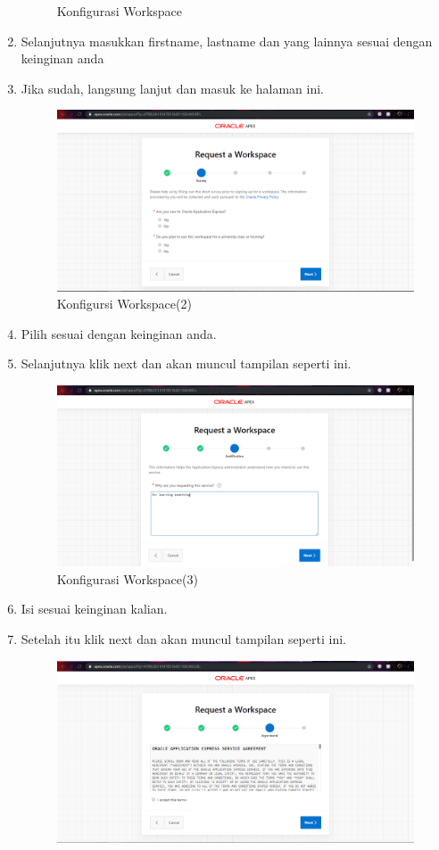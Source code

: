 \documentclass{article}
\begin{document}
\begin{enumerate}
\begin{figure}[!htbp]
        \caption{Konfigurasi Workspace}
    \end{figure}
    \item Selanjutnya masukkan firstname, lastname dan yang lainnya sesuai dengan keinginan anda
    \item Jika sudah, langsung lanjut dan masuk ke halaman ini.
    \begin{figure}[!htbp]
        \centering
        \includegraphics[scale=0.3]{figure/3.PNG}
        \caption{Konfigursi Workspace(2)}
    \end{figure}
\newpage
    \item Pilih sesuai dengan keinginan anda.
    \item Selanjutnya klik next dan akan muncul tampilan seperti ini.
    \begin{figure}[!htbp]
        \centering
        \includegraphics[scale=0.3]{figure/4.PNG}
        \caption{Konfigurasi Workspace(3)}
    \end{figure}
    \item Isi sesuai keinginan kalian.
    \item Setelah itu klik next dan akan muncul tampilan seperti ini.
    \begin{figure}[!htbp]
        \centering
        \includegraphics[scale=0.3]{figure/5.PNG}

\end{figure}
\end{enumerate}
\end{document}
